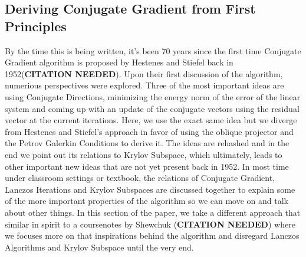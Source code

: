 \documentclass[]{article}
\theoremstyle{definition}
\begin{document}
    \subsection{Deriving Conjugate Gradient from First Principles}
        By the time this is being written, it's been 70 years since the first time Conjugate Gradient algorithm is proposed by Hestenes and Stiefel back in 1952(\textbf{CITATION NEEDED}). Upon their first discussion of the algorithm, numerious perspectives were explored. Three of the most important ideas are using Conjugate Directions, minimizing the energy norm of the error of the linear system and coming up with an update of the conjugate vectors using the residual vector at the current iterations. Here, we use the exact same idea but we diverge from Hestenes and Stiefel's approach in favor of using the oblique projector and the Petrov Galerkin Conditions to derive it. The ideas are rehashed and in the end we point out its relations to Krylov Subspace, which ultimately, leads to other important new ideas that are not yet present back in 1952. In most time under classroom settings or textbook, the relations of Conjugate Gradient, Lanczos Iterations and Krylov Subspaces are discussed together to explain some of the more important properties of the algorithm so we can move on and talk about other things. In this section of the paper, we take a different approach that similar in spirit to a coursenotes by Shewchuk (\textbf{CITATION NEEDED}) where we focuses more on that inspirations behind the algorithm and disregard Lanczos Algorithms and Krylov Subspace until the very end.  
\end{document}
